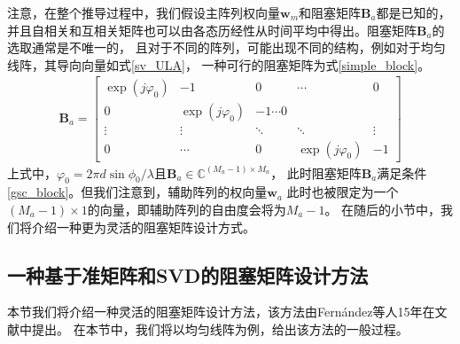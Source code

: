 \documentclass[master]{thesis-uestc}
\begin{document}
注意，在整个推导过程中，我们假设主阵列权向量$\bm{w}_m$和阻塞矩阵$\bm{B}_a$都是已知的，
并且自相关和互相关矩阵也可以由各态历经性从时间平均中得出。阻塞矩阵$\bm{B}_a$的选取通常是不唯一的，
且对于不同的阵列，可能出现不同的结构，例如对于均匀线阵，其导向向量如式\eqref{sv_ULA}，
一种可行的阻塞矩阵为式\eqref{simple_block}。
\begin{equation}\label{simple_block}
    \begin{aligned}
        \bm{B}_a = \begin{bmatrix}
                    \exp(j\varphi_0) & -1 & 0 & \cdots & 0 \\
                    0 & \exp(j\varphi_0) & -1 \cdots 0 \\
                    \vdots & \vdots & \ddots & \ddots & \vdots \\
                    0 & \cdots & 0 & \exp(j\varphi_0) & -1
                   \end{bmatrix}
    \end{aligned}
\end{equation}
上式中，$\varphi_0=2\pi d\sin\phi_0/\lambda$且$\bm{B}_a\in\mathbb{C}^{(M_a-1)\times M_a}$，
此时阻塞矩阵$\bm{B}_a$满足条件\eqref{gsc_block}。但我们注意到，辅助阵列的权向量$\bm{w}_a$
此时也被限定为一个$(M_a-1)\times1$的向量，即辅助阵列的自由度会将为$M_a-1$。
在随后的小节中，我们将介绍一种更为灵活的阻塞矩阵设计方式。

\subsection{一种基于准矩阵和SVD的阻塞矩阵设计方法}
本节我们将介绍一种灵活的阻塞矩阵设计方法，该方法由Fernández等人15年在文献\cite{Fernández}中提出。
在本节中，我们将以均匀线阵为例，给出该方法的一般过程。
\end{document}
